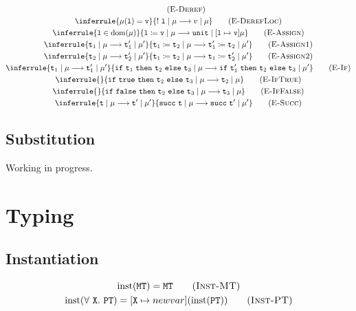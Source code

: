 \documentclass{report}
\newcommand{\code}{\mathtt}
\newcommand{\ruleTag}[1]{\label{#1}\tag{\textsc{#1}}}
\DeclareMathOperator{\domain}{dom}
\DeclareMathOperator{\instantiate}{inst}
\newcommand{\newVariable}{newvar}
\begin{document}
\begin{gather}
\ruleTag{E-Deref} \\
\inferrule
{\mu(\code{l}) = \code{v}}
{\code{!}\ \code{l}\mid\mu\longrightarrow v\mid\mu}
\ruleTag{E-DerefLoc} \\
\inferrule
{\code{l}\in\domain(\mu)}
{\code{l}\coloneqq\code{v}\mid\mu\longrightarrow \code{unit}\mid[\code{l}\mapsto\code{v}]\mu}
\ruleTag{E-Assign} \\
\inferrule
{\code{t}_1\mid\mu\longrightarrow\code{t}'_1\mid\mu'}
{\code{t}_1\coloneqq\code{t}_2\mid\mu\longrightarrow \code{t}'_1\coloneqq\code{t}_2\mid\mu'}
\ruleTag{E-Assign1} \\
\inferrule
{\code{t}_2\mid\mu\longrightarrow\code{t}'_2\mid\mu'}
{\code{t}_1\coloneqq\code{t}_2\mid\mu\longrightarrow \code{t}_1\coloneqq\code{t}'_2\mid\mu'}
\ruleTag{E-Assign2} \\
\inferrule
{\code{t}_1\mid\mu\longrightarrow\code{t}'_1\mid\mu'}
{\code{if}\ \code{t}_1\ \code{then}\ \code{t}_2\ \code{else}\ \code{t}_3\mid\mu\longrightarrow \code{if}\ \code{t}'_1\ \code{then}\ \code{t}_2\ \code{else}\ \code{t}_3\mid\mu'}
\ruleTag{E-If} \\
\inferrule
{}
{\code{if}\ \code{true}\ \code{then}\ \code{t}_2\ \code{else}\ \code{t}_3\mid\mu\longrightarrow \code{t}_2\mid\mu}
\ruleTag{E-IfTrue} \\
\inferrule
{}
{\code{if}\ \code{false}\ \code{then}\ \code{t}_2\ \code{else}\ \code{t}_3\mid\mu\longrightarrow \code{t}_3\mid\mu}
\ruleTag{E-IfFalse} \\
\inferrule
{\code{t}\mid\mu\longrightarrow\code{t}'\mid\mu'}
{\code{succ}\ \code{t}\mid\mu\longrightarrow \code{succ}\ \code{t}'\mid\mu'}
\ruleTag{E-Succ}
\end{gather}

\subsection{Substitution}

Working in progress.

\section{Typing}

\subsection{Instantiation}

\begin{gather}
\instantiate(\code{MT}) = \code{MT}
\ruleTag{Inst-MT} \\
\instantiate(\code{\forall\ X.\ PT}) = [\code{X}\mapsto\newVariable](\instantiate(\code{PT}))
\ruleTag{Inst-PT}
\end{gather}
\end{document}
